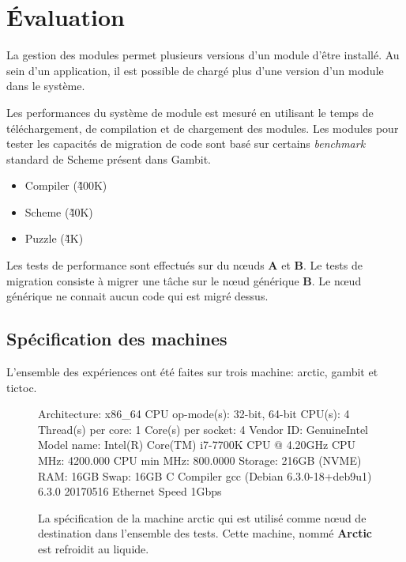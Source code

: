 \chapter{Évaluation}
La gestion des modules permet plusieurs versions d'un
module d'être installé. Au sein d'un application, il
est possible de chargé plus d'une version d'un module
dans le système.

Les performances du système de module est mesuré en utilisant
le temps de téléchargement, de compilation et de chargement
des modules. Les modules pour tester les capacités de
migration de code sont basé sur certains \textit{benchmark}
standard de Scheme présent dans Gambit.

\begin{itemize}
  \item Compiler (\~400K)
  \item Scheme (\~40K)
  \item Puzzle (\~4K)
\end{itemize}

Les tests de performance sont effectués sur du nœuds \textbf{A}
et \textbf{B}. Le tests de migration consiste à migrer une tâche
sur le nœud générique \textbf{B}. Le nœud générique ne connait aucun
code qui est migré dessus.



\section{Spécification des machines}
L'ensemble des expériences ont été faites sur trois machine: arctic, gambit et tictoc.

\begin{figure}[ht]
  \centering
\begin{mplisting}{1}
Architecture:          x86_64
CPU op-mode(s):        32-bit, 64-bit
CPU(s):                4
Thread(s) per core:    1
Core(s) per socket:    4
Vendor ID:             GenuineIntel
Model name:            Intel(R) Core(TM) i7-7700K CPU @ 4.20GHz
CPU MHz:               4200.000
CPU min MHz:           800.0000
Storage:               216GB (NVME)
RAM:                   16GB
Swap:                  16GB
C Compiler             gcc (Debian 6.3.0-18+deb9u1) 6.3.0 20170516
Ethernet Speed         1Gbps
\end{mplisting}
  \caption{La spécification de la machine arctic qui est utilisé comme nœud de destination dans
  l'ensemble des tests. Cette machine, nommé \textbf{Arctic} est refroidit au liquide.}
\end{figure}

